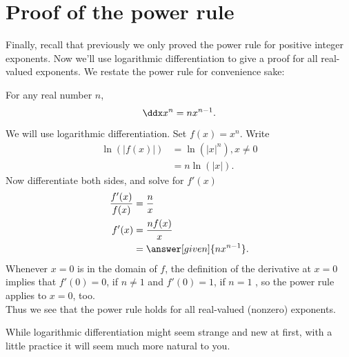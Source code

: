 \documentclass{ximera}
\begin{document}
\section{Proof of the power rule}


Finally, recall that previously we only proved the power rule for
positive integer exponents. Now we'll use logarithmic differentiation to give
a proof for all real-valued exponents. We restate the power rule
for convenience sake:

\begin{theorem}
For any  real number $n$, 
\[
\ddx x^n = n x^{n-1}.
\]
\begin{explanation}

We will use logarithmic differentiation. Set $f(x) = x^n$. Write
\begin{align*}
\ln(|f(x)|) &= \ln\left(|x|^n\right) , x\ne0\\ 
&= n\ln(|x|).
\end{align*}
Now differentiate both sides, and solve for $f'(x)$
\begin{align*}
\frac{f'(x)}{f(x)} &= \frac{n}{x}\\
f'(x) &=\frac{n f(x)}{x}\\
&= \answer[given]{n x^{n-1}}.
\end{align*}
Whenever $x=0$ is in the domain of $f$, the definition of the derivative at $x=0$ implies that  $f'(0)=0$, if $n\ne1$ and $f'(0)=1$, if $n=1$ , so the power rule applies to $x=0$, too.\\

Thus we see that the power rule holds for all real-valued (nonzero) exponents.
\end{explanation}
\end{theorem}

While logarithmic differentiation might seem strange and new at
first, with a little practice it will seem much more natural to you.
\end{document}
